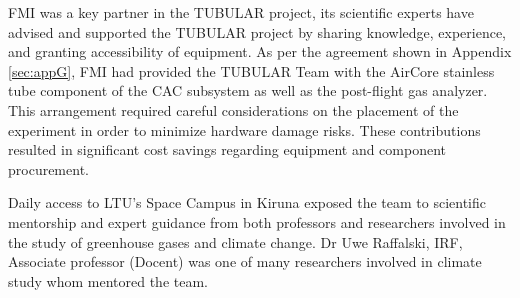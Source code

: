 FMI was a key partner in the TUBULAR project, its scientific experts have advised and supported the TUBULAR project by sharing knowledge, experience, and granting accessibility of equipment. As per the agreement shown in Appendix \ref{sec:appG}, FMI had provided the TUBULAR Team with the AirCore stainless tube component of the CAC subsystem as well as the post-flight gas analyzer. This arrangement required careful considerations on the placement of the experiment in order to minimize hardware damage risks. These contributions resulted in significant cost savings regarding equipment and component procurement.

Daily access to LTU's Space Campus in Kiruna exposed the team to scientific mentorship and expert guidance from both professors and researchers involved in the study of greenhouse gases and climate change. Dr Uwe Raffalski, IRF, Associate professor (Docent) was one of many researchers involved in climate study whom mentored the team.
